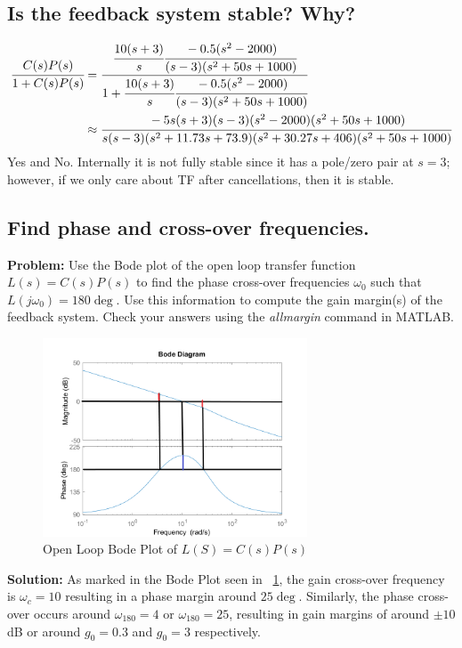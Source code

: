 \documentclass[letter]{article}
\numberwithin{equation}{section}
\begin{document}
\subsection{Is the feedback system stable? Why?}
\begin{align*}
	\cfrac{C(s) P(s)} {1 + C(s) P(s)}
		&= \cfrac{
			\cfrac{10 (s+3)}{s} \cfrac{-0.5(s^2 - 2000)}{(s-3)(s^2 + 50s + 1000)}
		}{
			1 + \cfrac{10 (s+3)}{s} \cfrac{-0.5(s^2 - 2000)}{(s-3)(s^2 + 50s + 1000)}
		}\\
		&\approx \cfrac{
			-5 s (s+3) (s-3) (s^2 - 2000) (s^2 + 50s + 1000)
		}{
			s (s-3) (s^2 + 11.73s + 73.9) (s^2 + 30.27s + 406) (s^2 + 50s + 1000)
		}
\end{align*}
Yes and No. 
Internally it is not fully stable since it has a pole/zero pair at $s=3$;
however, if we only care about TF after cancellations, then it is stable.

\subsection{Find phase and cross-over frequencies.}

\textbf{Problem:}
Use the Bode plot of the open loop transfer function $L(s) = C(s)P(s)$ to find the phase cross-over frequencies $\omega_0$ such that $L(j\omega_0) = 180\deg$. 
Use this information to compute the gain margin(s) of the feedback system. 
Check your answers using the \emph{allmargin} command in MATLAB.

\begin{figure}[ht]\label{fig:pblm4b}
	\centering
	\includegraphics[width=0.7\textwidth]{figs/pblm4_L_bode.png}
	\caption{Open Loop Bode Plot of $L(S) = C(s) P(s)$}
\end{figure}

\textbf{Solution:}
As marked in the Bode Plot seen in \figurename \ \ref{fig:pblm4b}, 
the gain cross-over frequency is $\omega_{c} = 10$ resulting in a phase margin around $25\deg$.
Similarly, the phase cross-over occurs around $\omega_{180} = 4$ or $\omega_{180} = 25$, resulting in gain margins of around $\pm 10$ dB or around $g_0 = 0.3$ and $g_0 = 3$ respectively.
\end{document}
